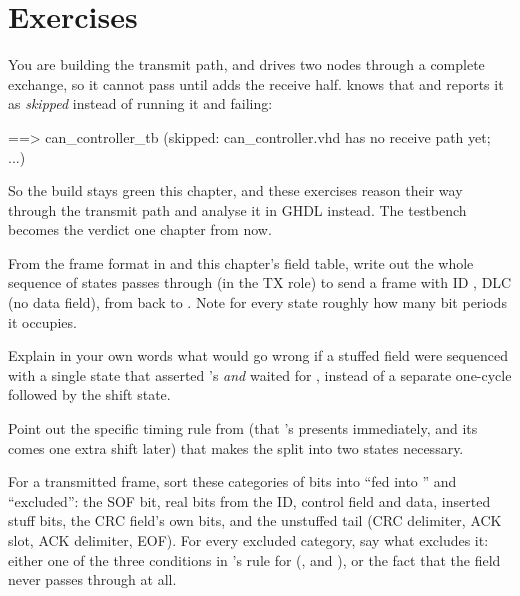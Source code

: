 
\section{Exercises}
\label{c16:sec:exercises}

\begin{aside}
You are building the transmit path, and  drives two nodes through a complete
exchange, so it cannot pass until  adds the receive half. 
knows that and reports it as \emph{skipped} instead of running it and failing:

\begin{console}
==> can_controller_tb (skipped: can_controller.vhd has no receive path yet; ...)
\end{console}

So the build stays green this chapter, and these exercises reason their way through the transmit path
and analyse it in GHDL instead. The testbench becomes the verdict one chapter from now.
\end{aside}

\label{c16:ex:shortframe}
From the frame format in  and this chapter's field table, write out the
whole sequence of states  passes through (in the TX role) to send a frame with ID
, DLC  (no data field), from  back to . Note for
every state roughly how many bit periods it occupies.

\label{c16:ex:loadstate}
 Explain in your own words what would go wrong if a stuffed field were sequenced with a
single state that asserted 's  \emph{and} waited for ,
instead of a separate one-cycle  followed by the shift state.

 Point out the specific timing rule from  (that 's
 presents immediately, and its  comes one extra shift later) that makes the
split into two states necessary.

\label{c16:ex:crcfeed}
 For a transmitted frame, sort these categories of bits into ``fed into '' and
``excluded'': the SOF bit, real bits from the ID, control field and data, inserted stuff bits, the CRC
field's own bits, and the unstuffed tail (CRC delimiter, ACK slot, ACK delimiter, EOF). For every
excluded category, say what excludes it: either one of the three conditions in
's rule for  (,  and
), or the fact that the field never passes through  at all.

